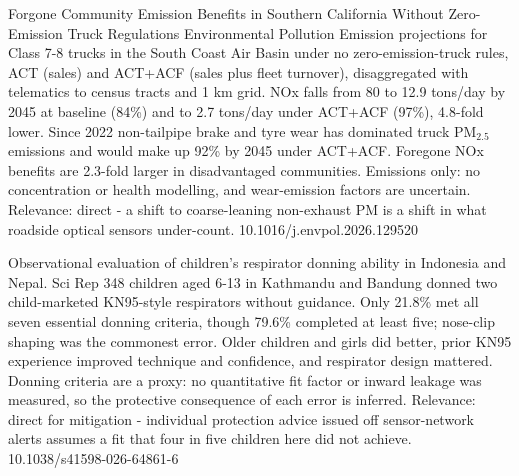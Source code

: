 \documentclass[10pt]{article}
\begin{document}
{Forgone Community Emission Benefits in Southern California Without Zero-Emission Truck Regulations}
{Environmental Pollution}
{Emission projections for Class 7-8 trucks in the South Coast Air Basin under no zero-emission-truck rules, ACT (sales) and ACT+ACF (sales plus fleet turnover), disaggregated with telematics to census tracts and 1 km grid. NOx falls from 80 to 12.9 tons/day by 2045 at baseline (84\%) and to 2.7 tons/day under ACT+ACF (97\%), 4.8-fold lower. Since 2022 non-tailpipe brake and tyre wear has dominated truck PM$_{2.5}$ emissions and would make up 92\% by 2045 under ACT+ACF. Foregone NOx benefits are 2.3-fold larger in disadvantaged communities. Emissions only: no concentration or health modelling, and wear-emission factors are uncertain. Relevance: direct - a shift to coarse-leaning non-exhaust PM is a shift in what roadside optical sensors under-count.}
{10.1016/j.envpol.2026.129520}

{Observational evaluation of children's respirator donning ability in Indonesia and Nepal.}
{Sci Rep}
{348 children aged 6-13 in Kathmandu and Bandung donned two child-marketed KN95-style respirators without guidance. Only 21.8\% met all seven essential donning criteria, though 79.6\% completed at least five; nose-clip shaping was the commonest error. Older children and girls did better, prior KN95 experience improved technique and confidence, and respirator design mattered. Donning criteria are a proxy: no quantitative fit factor or inward leakage was measured, so the protective consequence of each error is inferred. Relevance: direct for mitigation - individual protection advice issued off sensor-network alerts assumes a fit that four in five children here did not achieve.}
{10.1038/s41598-026-64861-6}

\par{}\baselineskip{}\baselineskip
{}
\end{document}

